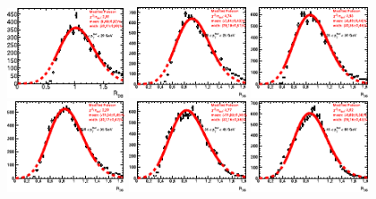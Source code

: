 \begin{figure}[t]
    \centering
    \includegraphics[width=0.31\textwidth]{plots/insitu/fits_MPF_smallR/mpf_fit_bin1.pdf}
    \includegraphics[width=0.31\textwidth]{plots/insitu/fits_MPF_smallR/mpf_fit_bin2.pdf}
    \includegraphics[width=0.31\textwidth]{plots/insitu/fits_MPF_smallR/mpf_fit_bin3.pdf}
    \includegraphics[width=0.31\textwidth]{plots/insitu/fits_MPF_smallR/mpf_fit_bin4.pdf}
    \includegraphics[width=0.31\textwidth]{plots/insitu/fits_MPF_smallR/mpf_fit_bin5.pdf}
    \includegraphics[width=0.31\textwidth]{plots/insitu/fits_MPF_smallR/mpf_fit_bin6.pdf}

\end{figure}
